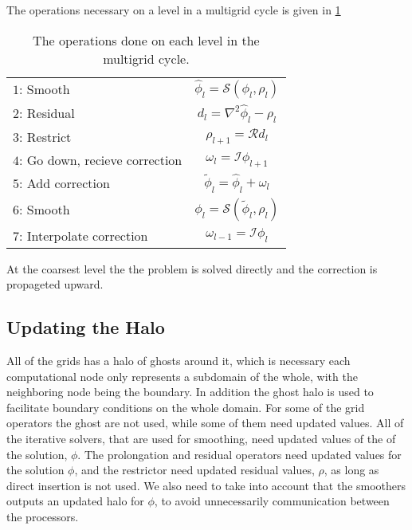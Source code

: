 		The operations necessary on a level in a multigrid cycle is given in \cref{tab:recursive}
		\begin{table}[h]
		\begin{tabular}	{l | c}
			\(1\): Smooth &\( \widehat{\phi}_l = \mathcal{S}(\phi_l, \rho_l)\)
			\\
			\(2\): Residual &	\(d_l = \nabla^2\widehat{\phi}_l - \rho_l\)
			\\
			\(3\): Restrict &\(\rho_{l+1} = \mathcal{R}d_l \) \nonumber
			\\
			\(4\): Go down, recieve correction & \(\omega_l = \mathcal{I} \phi_{l+1}\)
			\\
			\(5\): Add correction	&\(\widetilde{\phi}_l = \widehat{\phi}_l + \omega_l\)
			\\
			\(6\): Smooth	&\(\phi_l = \mathcal{S}(\widetilde{\phi}_l, \rho_l)\)
			\\
			\(7\): Interpolate correction &\( \omega_{l-1} = \mathcal{I} \phi_l\)
		\end{tabular}
		\caption{The operations done on each level in the multigrid cycle.}
		\label{tab:recursive}
		\end{table}

		At the coarsest level the the problem is solved directly and the correction is propageted upward.

		\subsection{Updating the Halo}
		All of the grids has a halo of ghosts around it, which is necessary each computational node
		only represents a subdomain of the whole, with the neighboring node being the boundary. In addition the
 		ghost halo is used to facilitate boundary conditions on the whole domain. For some of the grid operators
		the ghost are not used, while some of them need updated values. All of the iterative solvers, that are used
		for smoothing, need updated values of the of the solution, \(\phi\). The prolongation and residual operators need updated values
		for the solution \(\phi\), and the restrictor need updated residual values, \(\rho\), as long as direct insertion is not used.
		We also need to take into account that the smoothers outputs an updated halo for \(\phi\), to avoid
		unnecessarily communication between the processors.

